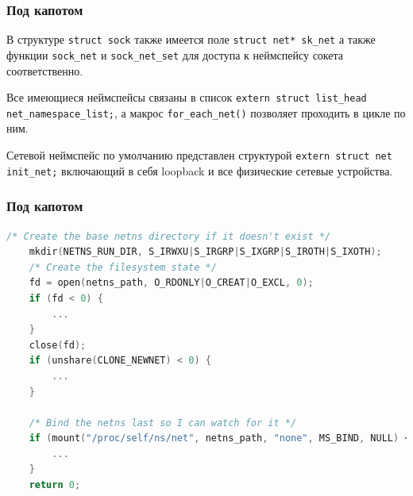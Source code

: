 \begin{frame}[fragile]
\frametitle{Под капотом}
    В структуре \texttt{struct sock} также имеется поле \texttt{struct net* sk\_net} а также функции \texttt{sock\_net} и \texttt{sock\_net\_set} для доступа к неймспейсу сокета соответственно.

    Все имеющиеся неймспейсы связаны в список \texttt{extern struct list\_head net\_namespace\_list;}, а макрос \texttt{for\_each\_net()} позволяет проходить в цикле по ним.

    Сетевой неймспейс по умолчанию представлен структурой \texttt{extern struct net init\_net;} включающий в себя loopback и все физические сетевые устройства. 

\end{frame}

\begin{frame}[fragile]
\frametitle{Под капотом}
\begin{block}{}
    \begin{lstlisting}[title=\href{https://github.com/shemminger/iproute2/blob/master/ip/ipnetns.c}{ipnetns.c}, language=c, basicstyle={\fontsize{6}{6}\ttfamily}]
    /* Create the base netns directory if it doesn't exist */
	mkdir(NETNS_RUN_DIR, S_IRWXU|S_IRGRP|S_IXGRP|S_IROTH|S_IXOTH);
	/* Create the filesystem state */
	fd = open(netns_path, O_RDONLY|O_CREAT|O_EXCL, 0);
	if (fd < 0) {
		...	
    }
	close(fd);
	if (unshare(CLONE_NEWNET) < 0) {
		...	
    }

	/* Bind the netns last so I can watch for it */
	if (mount("/proc/self/ns/net", netns_path, "none", MS_BIND, NULL) < 0) {
		...
    }
	return 0;
\end{lstlisting}
\end{block}
\end{frame}

